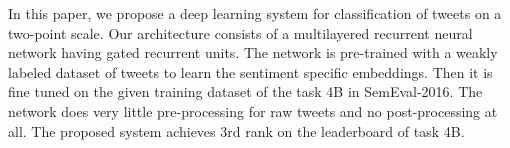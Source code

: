 In this paper, we propose a deep learning system for classification of tweets on a two-point scale. Our architecture consists of a multilayered recurrent neural network having gated recurrent units. The network is pre-trained with a weakly labeled dataset of tweets to learn the sentiment specific embeddings. Then it is fine tuned on the given training dataset of the task 4B in SemEval-2016. The network does very little pre-processing for raw tweets and no post-processing at all. The proposed system achieves 3rd rank on the leaderboard of task 4B.
